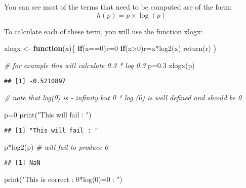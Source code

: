 \documentclass[
]{article}
\newenvironment{Shaded}{\begin{snugshade}}{\end{snugshade}}
\newcommand{\CommentTok}[1]{\textcolor[rgb]{0.56,0.35,0.01}{\textit{#1}}}
\newcommand{\ControlFlowTok}[1]{\textcolor[rgb]{0.13,0.29,0.53}{\textbf{#1}}}
\newcommand{\DecValTok}[1]{\textcolor[rgb]{0.00,0.00,0.81}{#1}}
\newcommand{\FloatTok}[1]{\textcolor[rgb]{0.00,0.00,0.81}{#1}}
\newcommand{\FunctionTok}[1]{\textcolor[rgb]{0.00,0.00,0.00}{#1}}
\newcommand{\NormalTok}[1]{#1}
\newcommand{\OtherTok}[1]{\textcolor[rgb]{0.56,0.35,0.01}{#1}}
\newcommand{\SpecialCharTok}[1]{\textcolor[rgb]{0.00,0.00,0.00}{#1}}
\newcommand{\StringTok}[1]{\textcolor[rgb]{0.31,0.60,0.02}{#1}}
\begin{document}
You can see most of the terms that need to be computed are of the form:
\[ h(p)=   p\times \log(p)\]

To calculate each of these term, you will use the function xlogx:

\begin{Shaded}
\begin{Highlighting}[]
\NormalTok{xlogx }\OtherTok{\textless{}{-}} \ControlFlowTok{function}\NormalTok{(x)\{}
\ControlFlowTok{if}\NormalTok{(x}\SpecialCharTok{==}\DecValTok{0}\NormalTok{)r}\OtherTok{=}\DecValTok{0}
\ControlFlowTok{if}\NormalTok{(x}\SpecialCharTok{\textgreater{}}\DecValTok{0}\NormalTok{)r}\OtherTok{=}\NormalTok{x}\SpecialCharTok{*}\FunctionTok{log2}\NormalTok{(x)}
\FunctionTok{return}\NormalTok{(r)}
\NormalTok{\}}

\CommentTok{\# for example this will calculate 0.3 * log 0.3}
\NormalTok{p}\OtherTok{=}\FloatTok{0.3}
\FunctionTok{xlogx}\NormalTok{(p)}
\end{Highlighting}
\end{Shaded}

\begin{verbatim}
## [1] -0.5210897
\end{verbatim}

\begin{Shaded}
\begin{Highlighting}[]
\CommentTok{\# note that log(0) is {-} infinity but 0 * log (0) is well defined and should be 0}

\NormalTok{p}\OtherTok{=}\DecValTok{0}
\FunctionTok{print}\NormalTok{(}\StringTok{"This will fail : "}\NormalTok{)}
\end{Highlighting}
\end{Shaded}

\begin{verbatim}
## [1] "This will fail : "
\end{verbatim}

\begin{Shaded}
\begin{Highlighting}[]
\NormalTok{p}\SpecialCharTok{*}\FunctionTok{log2}\NormalTok{(p)  }\CommentTok{\# will fail to produce 0}
\end{Highlighting}
\end{Shaded}

\begin{verbatim}
## [1] NaN
\end{verbatim}

\begin{Shaded}
\begin{Highlighting}[]
\FunctionTok{print}\NormalTok{(}\StringTok{"This is correct : 0*log(0)=0 :  "}\NormalTok{)}
\end{Highlighting}
\end{Shaded}
\end{document}
